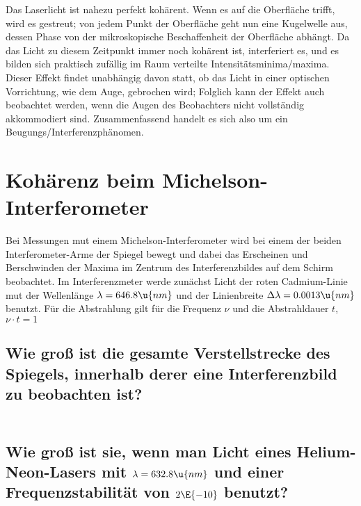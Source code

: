 \documentclass[ex]{exercise}
\begin{document}
\dottedlinett

Das Laserlicht ist nahezu perfekt kohärent. Wenn es auf die Oberfläche 
trifft, wird es gestreut; von jedem Punkt der Oberfläche geht nun eine Kugelwelle aus,
dessen Phase von der mikroskopische Beschaffenheit der Oberfläche abhängt. 
Da das Licht zu diesem Zeitpunkt immer noch kohärent ist, interferiert es, und es bilden
sich praktisch zufällig im Raum verteilte Intensitätsminima/maxima. 
Dieser Effekt findet unabhängig davon statt, ob das Licht in einer optischen Vorrichtung, wie 
dem Auge, gebrochen wird; Folglich kann der Effekt auch beobachtet werden, wenn die 
Augen des Beobachters nicht vollständig akkommodiert sind.
Zusammenfassend handelt es sich also um ein Beugungs/Interferenzphänomen.




\section{Kohärenz beim Michelson-Interferometer}
Bei Messungen mut einem Michelson-Interferometer wird bei einem der beiden 
Interferometer-Arme der Spiegel bewegt und dabei das Erscheinen und Berschwinden der 
Maxima im Zentrum des Interferenzbildes auf dem Schirm beobachtet. Im Interferenzmeter
werde zunächst Licht der roten Cadmium-Linie mut der Wellenlänge \(\lambda=646.8\u{nm}\)
und der Linienbreite \(\Delta \lambda = 0.0013\u{nm}\) benutzt. Für die Abstrahlung 
gilt für die Frequenz \(\nu\) und die Abstrahldauer \(t\), \(\nu \cdot t=1\)

\subsection{Wie groß ist die gesamte Verstellstrecke des Spiegels, innerhalb derer eine 
Interferenzbild zu beobachten ist?}

\dottedlinett

\begin{align*}    
\end{align*}


\subsection{Wie groß ist sie, wenn man Licht eines Helium-Neon-Lasers mit 
\(\lambda = 632.8\u{nm}\) und einer Frequenzstabilität von \(2\E{-10}\) benutzt?}

\dottedlinett

\begin{align*}
\end{align*}
\end{document}
